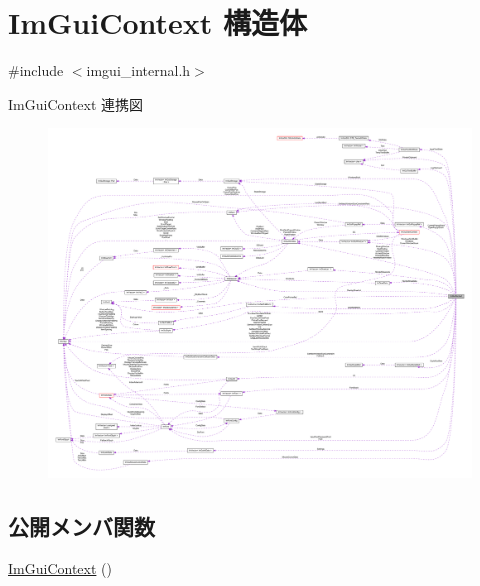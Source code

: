\hypertarget{struct_im_gui_context}{}\section{Im\+Gui\+Context 構造体}
\label{struct_im_gui_context}


{\ttfamily \#include $<$imgui\+\_\+internal.\+h$>$}



Im\+Gui\+Context 連携図\nopagebreak
\begin{figure}[H]
\begin{center}
\leavevmode
\includegraphics[width=350pt]{struct_im_gui_context__coll__graph}
\end{center}
\end{figure}
\subsection*{公開メンバ関数}
\begin{DoxyCompactItemize}
\item 
\mbox{\hyperlink{struct_im_gui_context_a28776600467e31fcc353a8aedec727f1}{Im\+Gui\+Context}} ()
\end{DoxyCompactItemize}
